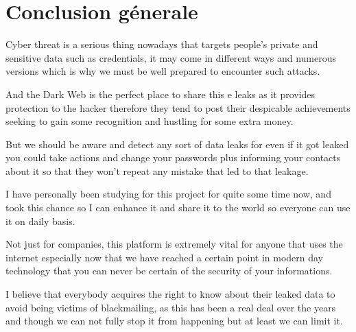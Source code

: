 \chapter*{Conclusion génerale}
Cyber threat is a serious thing nowadays that targets people's private and sensitive data such as credentials, it may come in different ways and numerous versions which is why we must be well prepared to encounter such attacks.

And the Dark Web is the perfect place to share this e leaks as it provides protection to the hacker therefore they tend to post their despicable achievements seeking to gain some recognition and hustling for some extra money.

But we should be aware and detect any sort of data leaks for even if it got leaked you could take actions and change your passwords plus informing your contacts about it so that they won't repeat any mistake that led to that leakage. 

I have personally been studying for this  project for quite some time now, and took this chance so I can enhance it and share it to the world so everyone can use it on daily basis.

Not just for companies, this platform is extremely vital for anyone that uses the internet especially now that we have reached a certain point in modern day technology that you can never be certain of the security of your informations.

I believe that everybody acquires the right to know about their leaked data to avoid being victims of blackmailing, as this has been a real deal over the years and though we can not fully stop it from happening but at least we can limit it.

